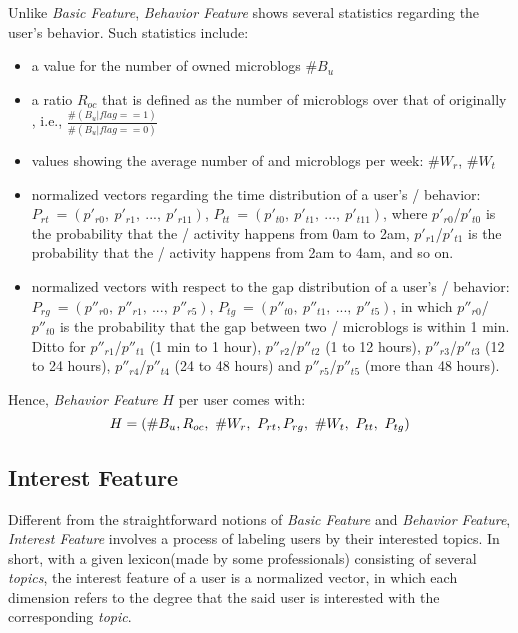Unlike \textit{Basic Feature}, \textit{Behavior Feature} shows several statistics regarding the user's \retg{} behavior.
Such statistics include:
\begin{itemize}
	\item a value for the number of owned microblogs $\#B_u$
	\item a ratio $R_{oc}$ that is defined as the number of \retd{} microblogs over that of originally \twd{}, i.e., $\frac{\#(B_u | flag ==1)}{\#(B_u | flag ==0)}$
	\item values showing the average number of \retd{} and \twd{} microblogs per week: $\#W_r$, $\#W_t$
	\item normalized vectors regarding the time distribution of a user's \retg{}/\twg{} behavior: $P_{rt}\ = (p'_{r0},\ p'_{r1},\ ...,\ p'_{r11})$, $P_{tt}\ = (p'_{t0},\ p'_{t1},\ ...,\ p'_{t11})$, where $p'_{r0}$/$p'_{t0}$ is the probability that the \retg{}/\twg{} activity happens from 0am to 2am, $p'_{r1}$/$p'_{t1}$ is the probability that the \retg{}/\twg{} activity happens from 2am to 4am, and so on.

	\item normalized vectors with respect to the gap distribution of a user's \retg{}/\twg{} behavior: $P_{rg}\ = (p''_{r0},\ p''_{r1},\ ...,\ p''_{r5})$, $P_{tg}\ = (p''_{t0},\ p''_{t1},\ ...,\ p''_{t5})$, in which $p''_{r0}$/$p''_{t0}$ is the probability that the gap between two \retd{}/\twg{} microblogs is within 1 min. Ditto for $p''_{r1}$/$p''_{t1}$ (1 min to 1 hour), $p''_{r2}$/$p''_{t2}$ (1 to 12 hours), $p''_{r3}$/$p''_{t3}$ (12 to 24 hours), $p''_{r4}$/$p''_{t4}$ (24 to 48 hours) and  $p''_{r5}$/$p''_{t5}$ (more than 48 hours).
\end{itemize}

Hence, \textit{Behavior Feature} $H$ per user comes with:
\begin{equation}
\label{eq:beha}
	H = (\#B_u, R_{oc},\ \#W_r,\ P_{rt},\\
    P_{rg},\ \#W_t,\ P_{tt},\ P_{tg})
\end{equation}

\subsection{Interest Feature}

Different from the straightforward notions of \textit{Basic Feature} and \textit{Behavior Feature}, \textit{Interest Feature} involves a process of labeling users by their interested topics.
In short, with a given lexicon(made by some professionals) consisting of several \textit{topics}, the interest feature of a user is a normalized vector, in which each dimension refers to the degree that the said user is interested with the corresponding \textit{topic}.

